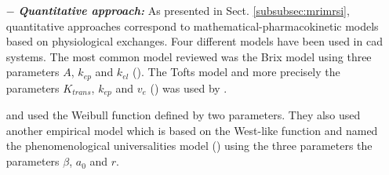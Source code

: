 \begin{enumerate}[leftmargin=*]
\item[$-$] \textbf{\textit{Quantitative approach:}} As presented in Sect. \ref{subsubsec:mrimrsi}, quantitative approaches correspond to mathematical-pharmacokinetic models based on physiological exchanges. Four different models have been used in \ac{cad} systems. The most common model reviewed was the Brix model using three parameters $A$, $k_{ep}$ and $k_{el}$ (\cite{Artan2009,Artan2010,Sung2011,Liu2009,Ozer2009,Ozer2010}). %
%
The Tofts model and more precisely the parameters $K_{trans}$, $k_{ep}$ and $v_e$ (\cite{Tofts1997}) was used by \cite{Langer2009,Litjens2011,Litjens2012,Litjens2014,Giannini2013,Niaf2011,Niaf2012,Mazzetti2011}.%
%

\cite{Mazzetti2011} and \cite{Giannini2013} used the Weibull function defined by two parameters. %
%
They also used another empirical model which is based on the West-like function and named the phenomenological universalities model (\cite{Castorina2006}) using the three parameters the parameters $\beta$, $a_0$ and $r$.%
%


\end{enumerate}
